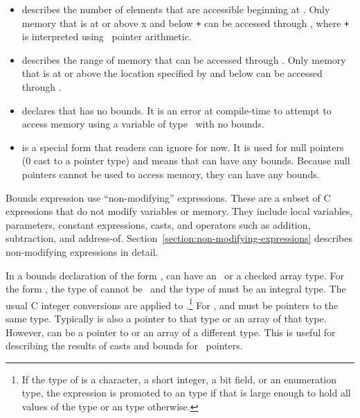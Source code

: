 \begin{itemize}
\item
   describes the number of
  elements that are accessible beginning at . Only memory that
  is at or above x and below  \texttt{+}  can be
  accessed through , where  \texttt{+}  is
  interpreted using \arrayptr\ pointer arithmetic.
\item
  describes the range of memory that can be accessed through .
  Only memory that is at or above the location specified by 
  and below  can be accessed through .
\item
   declares that  has no bounds.
  It is an error at compile-time to attempt to access memory using a
  variable of type \arrayptr\ with no bounds.
\item
   is a special form that readers can
  ignore for now. It is used for null pointers (0 cast to a pointer
  type) and means that  can have any bounds. Because null
  pointers cannot be used to access memory, they can have any bounds.
\end{itemize}

Bounds expression use ``non-modifying'' expressions. These are a subset
of C expressions that do not modify variables or memory. They include
local variables, parameters, constant expressions, casts, and operators
such as addition, subtraction, and address-of. 
Section~\ref{section:non-modifying-expressions}  describes
non-modifying expressions in detail.

In a bounds declaration of the form ,
 can have an \arrayptr\ or a checked array type.
For the form  ,  the type of
 cannot be \arrayptrvoid\ and the type of  must be an integral type.
The usual C integer conversions are applied to .\footnote{If the
type of  is a character, a short integer, a bit field, or an enumeration type,
the expression is promoted to an  type if that is large
enough to  hold all values of the type or an  type otherwise.}
For ,  and
 must be pointers to the same type.  Typically  is also 
a pointer to that type or an array of that type.  
However,  can be a pointer to or an array of a different type.
This is useful for describing the results of casts and
bounds for \arrayptrvoid\ pointers.

